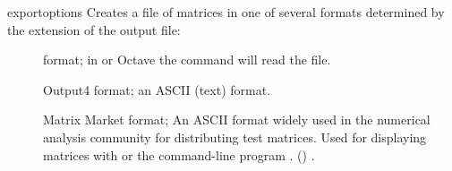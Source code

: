 \begin{cmdref}{export}{options}
Creates a file of matrices in one of several formats determined
by the extension of the output file:
\begin{description}
\item[] \Octlab format; in \Matlab{}
or Octave the  command will read the file.
\item[] \Nastran Output4 format; an ASCII (text) format.
\item[] Matrix Market format;
   An ASCII format widely used in the numerical analysis community
   for distributing test matrices. Used for displaying
   matrices with  or the command-line
	program .
   () \cite{matrixmarket}.
\end{description}

\begin{subopts}
\end{subopts}
\end{cmdref}


